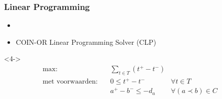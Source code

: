 \begin{frame}\frametitle{Linear Programming}
    \begin{itemize}
        \item {}  
        \item<5-> COIN-OR Linear Programming Solver (CLP)
    \end{itemize}

    \begin{definitie}<4->
        \begin{align}
            \text{max:}& \quad \sum_{t \in T} (t^+ - t^-) & \nonumber \\
            \text{met voorwaarden:} & \quad 0 \leq t^+ - t^- & \forall t \in T \nonumber \\
                                    & \quad a^+ - b^- \leq -d_a & \forall (a \prec b) \in C \nonumber
        \end{align}
    \end{definitie}
\end{frame}
